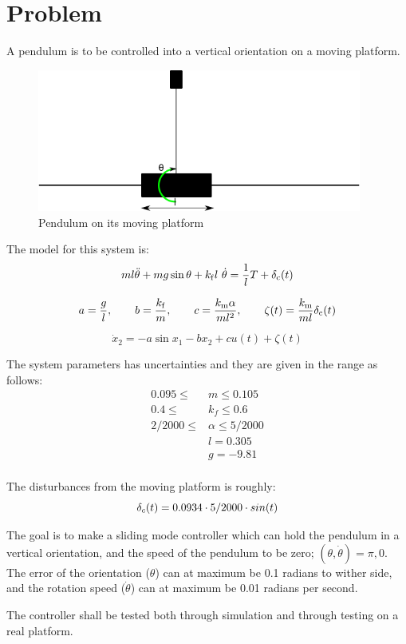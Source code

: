 \chapter{Problem}
A pendulum is to be controlled into a vertical orientation on a moving platform.
\begin{figure}[htbp]
        \centering
        \includegraphics[width=0.95\textwidth]{pendul.png}
        \caption{Pendulum on its moving platform}
        \label{fig:problem}
\end{figure}
The model for this system is:
\begin{equation}
        m l \Ddot{\theta} + m g \sin\theta + k_{\mathrm{f}}  l \ \dot{\theta} = \frac{1}{l}T + \delta_{\mathrm{c}}(t)
\end{equation}

\begin{equation}
        a=\frac{g}{l}, \qquad b=\frac{k_{\mathrm{f}}}{m}, \qquad c= \frac{k_{\mathrm{m}}\alpha}{m l^2}, \qquad \zeta(t) = \frac{k_{\mathrm{m}}}{m l} \delta_{\mathrm{c}}(t)
\end{equation}

\begin{equation}
        \dot{x}_2 = - a \sin x_1 - b x_2 + c u(t) + \zeta(t)
\end{equation}

The system parameters has uncertainties and they are given in the range as follows:
\begin{equation}
        \begin{split}
                0.095 \leq &m \leq 0.105 \\
                0.4 \leq &k_f \leq 0.6 \\
                2/2000 \leq &\alpha \leq 5/2000 \\
                &l = 0.305 \\
                &g = -9.81 \\
        \end{split}
\end{equation}

The disturbances from the moving platform is roughly:
\begin{equation}
        \delta_c(t) = 0.0934 \cdot 5/2000 \cdot sin(t)
\end{equation}

The goal is to make a sliding mode controller which can hold the pendulum in a vertical orientation, and the speed of the pendulum to be zero; $(\theta, \dot{\theta})= \pi, 0$. The error of the orientation ($\theta$) can at maximum be 0.1 radians to wither side, and the rotation speed ($\dot{\theta}$) can at maximum be 0.01 radians per second.

The controller shall be tested both through simulation and through testing on a real platform.